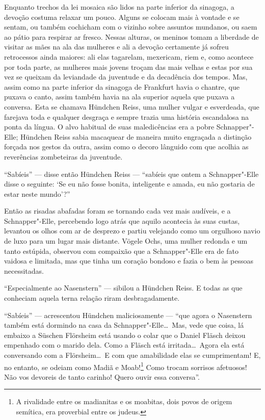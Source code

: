 Enquanto trechos da lei mosaica são lidos na parte inferior da sinagoga,
a devoção costuma relaxar um pouco. Alguns se colocam mais à vontade e
se sentam, ou também cochicham com o vizinho sobre assuntos mundanos,
ou saem ao pátio para respirar ar fresco. Nessas alturas, os meninos
tomam a liberdade de visitar as mães na ala das mulheres e ali a
devoção certamente já sofreu retrocessos ainda maiores: ali elas
tagarelam, mexericam, riem e, como acontece por toda parte, as mulheres
mais jovens troçam das mais velhas e estas por sua vez se queixam da
leviandade da juventude e da decadência dos tempos. Mas, assim como na
parte inferior da sinagoga de Frankfurt havia o chantre, que puxava o
canto, assim também havia na ala superior aquela que puxava a conversa.
Esta se chamava Hündchen Reiss, uma mulher vulgar e esverdeada, que
farejava toda e qualquer desgraça e sempre trazia uma história
escandalosa na ponta da língua. O alvo habitual de suas maledicências
era a pobre Schnapper"-Elle; Hündchen Reiss sabia macaquear de maneira
muito engraçada a distinção forçada nos gestos da outra, assim como o
decoro lânguido com que acolhia as reverências zombeteiras da
juventude.

``Sabíeis'' --- disse então Hündchen Reiss --- ``sabíeis que ontem a
Schnapper"-Elle disse o seguinte: ‘Se eu não fosse bonita, inteligente
e amada, eu não gostaria de estar neste mundo’?''

Então as risadas abafadas foram se tornando cada vez mais audíveis, e a
Schnapper"-Elle, percebendo logo atrás que aquilo acontecia às suas
custas, levantou os olhos com ar de desprezo e partiu velejando como um
orgulhoso navio de luxo para um lugar mais distante. Vögele Ochs, uma
mulher redonda e um tanto estúpida, observou com compaixão que a
Schnapper"-Elle era de fato vaidosa e limitada, mas que tinha um
coração bondoso e fazia o bem às pessoas necessitadas.

``Especialmente ao Nasenstern'' --- sibilou a Hündchen Reiss. E todas as que
conheciam aquela terna relação riram desbragadamente.

``Sabíeis'' --- acrescentou Hündchen maliciosamente --- ``que agora o
Nasenstern também está dormindo na casa da Schnapper"-Elle\ldots\ Mas,
vede que coisa, lá embaixo a Süschen Flörsheim está usando o colar que
o Daniel Fläsch deixou empenhado com o marido dela. Como a Fläsch está
irritada\ldots\ Agora ela está conversando com a Flörsheim\ldots\ E com que
amabilidade elas se cumprimentam! E, no entanto, se odeiam como Madiã e
Moab!\footnote{ A
rivalidade entre os madianitas e os moabitas, dois povos de origem
semítica, era proverbial entre os judeus.}
 Como trocam sorrisos afetuosos! Não vos devoreis de tanto carinho!
Quero ouvir essa conversa''.

